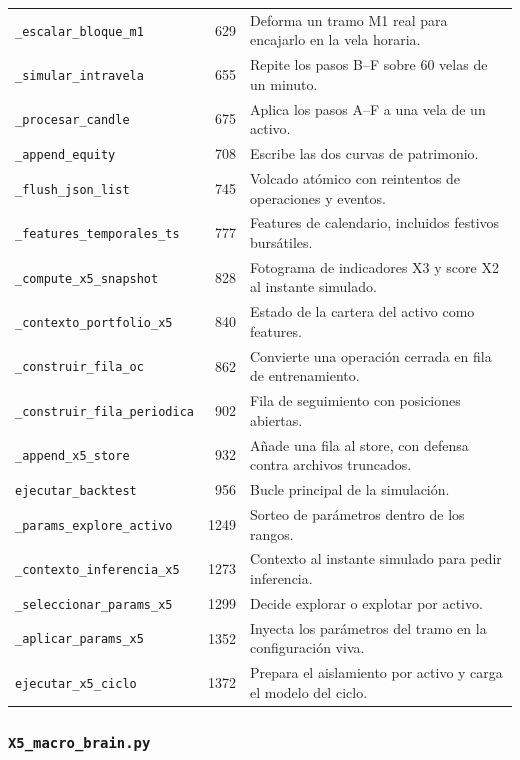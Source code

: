 \documentclass[11pt,a4paper]{article}
\newcommand{\code}[1]{\texttt{\small #1}}
\begin{document}
\begin{longtable}{@{}p{5.2cm} r p{\dimexpr\linewidth-7.3cm\relax}@{}}
\code{_escalar_bloque_m1} & 629 & Deforma un tramo M1 real para encajarlo en la vela horaria. \\
\code{_simular_intravela} & 655 & Repite los pasos B--F sobre 60 velas de un minuto. \\
\code{_procesar_candle} & 675 & Aplica los pasos A--F a una vela de un activo. \\
\code{_append_equity} & 708 & Escribe las dos curvas de patrimonio. \\
\code{_flush_json_list} & 745 & Volcado atómico con reintentos de operaciones y eventos. \\
\code{_features_temporales_ts} & 777 & Features de calendario, incluidos festivos bursátiles. \\
\code{_compute_x5_snapshot} & 828 & Fotograma de indicadores X3 y score X2 al instante simulado. \\
\code{_contexto_portfolio_x5} & 840 & Estado de la cartera del activo como features. \\
\code{_construir_fila_oc} & 862 & Convierte una operación cerrada en fila de entrenamiento. \\
\code{_construir_fila_periodica} & 902 & Fila de seguimiento con posiciones abiertas. \\
\code{_append_x5_store} & 932 & Añade una fila al store, con defensa contra archivos truncados. \\
\code{ejecutar_backtest} & 956 & Bucle principal de la simulación. \\
\code{_params_explore_activo} & 1249 & Sorteo de parámetros dentro de los rangos. \\
\code{_contexto_inferencia_x5} & 1273 & Contexto al instante simulado para pedir inferencia. \\
\code{_seleccionar_params_x5} & 1299 & Decide explorar o explotar por activo. \\
\code{_aplicar_params_x5} & 1352 & Inyecta los parámetros del tramo en la configuración viva. \\
\code{ejecutar_x5_ciclo} & 1372 & Prepara el aislamiento por activo y carga el modelo del ciclo. \\
\bottomrule
\end{longtable}

\subsubsection{\code{X5_macro_brain.py}}
\end{document}
